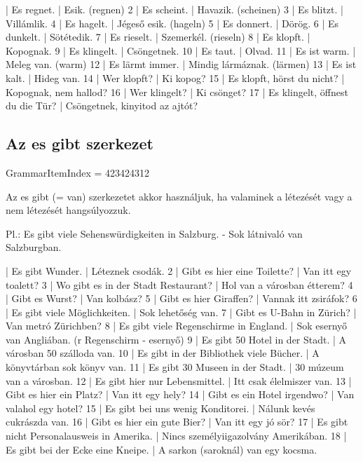 \documentclass{article}
\newenvironment{desc}{\verbatim}{\endverbatim}
\newenvironment{exmp}{\verbatim}{\endverbatim}
\begin{document}
\begin{exmp}
1 | Es regnet. | Esik. (regnen)
2 | Es scheint. | Havazik. (scheinen)
3 | Es blitzt. | Villámlik.
4 | Es hagelt. | Jégeső esik. (hageln)
5 | Es donnert. | Dörög.
6 | Es dunkelt. | Sötétedik.
7 | Es rieselt. | Szemerkél. (rieseln)
8 | Es klopft. | Kopognak.
9 | Es klingelt. | Csöngetnek.
10 | Es taut. | Olvad.
11 | Es ist warm. | Meleg van. (warm)
12 | Es lärmt immer. | Mindig lármáznak. (lärmen)
13 | Es ist kalt. | Hideg van.
14 | Wer klopft? | Ki kopog?
15 | Es klopft, hörst du nicht? | Kopognak, nem hallod?
16 | Wer klingelt? | Ki csönget?
17 | Es klingelt, öffnest du die Tür? | Csöngetnek, kinyitod az ajtót?
\end{exmp}

\subsection{Az es gibt szerkezet}

GrammarItemIndex = 423424312

\begin{desc}
Az es gibt (= van) szerkezetet akkor használjuk, ha valaminek a létezését vagy a nem létezését hangsúlyozzuk.

Pl.: Es gibt viele Sehenswürdigkeiten in Salzburg. - Sok látnivaló van Salzburgban.
\end{desc}

\begin{exmp}
1 | Es gibt Wunder. | Léteznek csodák.
2 | Gibt es hier eine Toilette? | Van itt egy toalett?
3 | Wo gibt es in der Stadt Restaurant? | Hol van a városban étterem?
4 | Gibt es Wurst? | Van kolbász?
5 | Gibt es hier Giraffen? | Vannak itt zsiráfok?
6 | Es gibt viele Möglichkeiten. | Sok lehetőség van.
7 | Gibt es U-Bahn in Zürich? | Van metró Zürichben?
8 | Es gibt viele Regenschirme in England. | Sok esernyő van Angliában. (r Regenschirm - esernyő)
9 | Es gibt 50 Hotel in der Stadt. | A városban 50 szálloda van.
10 | Es gibt in der Bibliothek viele Bücher. | A könyvtárban sok könyv van.
11 | Es gibt 30 Museen in der Stadt. | 30 múzeum van a városban.
12 | Es gibt hier nur Lebensmittel. | Itt csak élelmiszer van.
13 | Gibt es hier ein Platz? | Van itt egy hely?
14 | Gibt es ein Hotel irgendwo? | Van valahol egy hotel?
15 | Es gibt bei uns wenig Konditorei. | Nálunk kevés cukrászda van.
16 | Gibt es hier ein gute Bier? | Van itt egy jó sör?
17 | Es gibt nicht Personalausweis in Amerika. | Nincs személyiigazolvány Amerikában.
18 | Es gibt bei der Ecke eine Kneipe. | A sarkon (saroknál) van egy kocsma.
\end{exmp}
\end{document}
